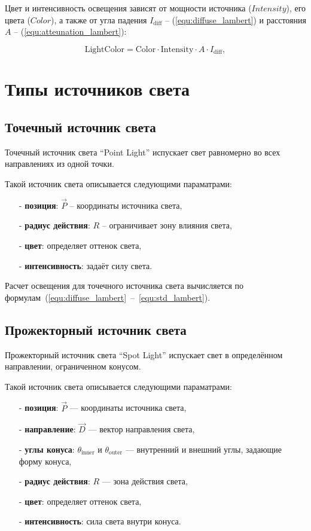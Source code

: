 Цвет и интенсивность освещения зависят от мощности источника (\(Intensity\)), его цвета (\(Color\)), а также от угла падения \(I_{\text{diff}}\) -- (\ref{equ:diffuse_lambert}) и расстояния \(A\) -- (\ref{equ:atteunation_lambert}):

\begin{equation}
    \label{equ:std_lambert}
    \text{LightColor} = \text{Color} \cdot \text{Intensity} \cdot A \cdot I_{\text{diff}},
\end{equation}

\section{Типы источников света}

\subsection{Точечный источник света}

Точечный источник света \enquote{Point Light} испускает свет равномерно во всех направлениях из одной точки. 

Такой источник света описывается следующими параматрами:

\begin{itemize}
    \item[-] \textbf{позиция}: \(\vec{P}\) -- координаты источника света,
    \item[-] \textbf{радиус действия}: \(R\) -- ограничивает зону влияния света,
    \item[-] \textbf{цвет}: определяет оттенок света,
    \item[-] \textbf{интенсивность}: задаёт силу света.
\end{itemize}

Расчет освещения для точечного источника света вычисляется по формулам~(\ref{equ:diffuse_lambert}~--~\ref{equ:std_lambert}).

\subsection{Прожекторный источник света}

Прожекторный источник света \enquote{Spot Light} испускает свет в определённом направлении,
ограниченном конусом.

Такой источник света описывается следующими параматрами:

\begin{itemize}
    \item[-] \textbf{позиция}: \(\vec{P}\) — координаты источника света,
    \item[-] \textbf{направление}: \(\vec{D}\) — вектор направления света,
    \item[-] \textbf{углы конуса}: \(\theta_{\text{inner}}\) и \(\theta_{\text{outer}}\) — внутренний и внешний углы, задающие форму конуса,
    \item[-] \textbf{радиус действия}: \(R\) — зона действия света,
    \item[-] \textbf{цвет}: определяет оттенок света,
    \item[-] \textbf{интенсивность}: сила света внутри конуса.
\end{itemize}

